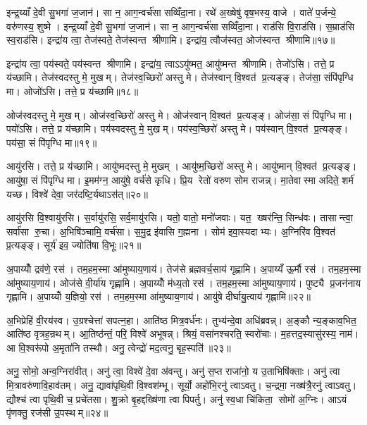 इन्द्र॒य्याँ दे॒वी सु॒भगा॑ ज॒जान॑। सा न॒ आग॒न्वर्च॑सा सव्विँदा॒ना। रथे॑ अ॒ख्षेषु॑ वृष॒भस्य॒ वाजे। वाते॑ प॒र्जन्ये॒ वरु॑णस्य॒ शुष्मे। इन्द्र॒य्याँ दे॒वी सु॒भगा॑ ज॒जान॑। सा न॒ आग॒न्वर्च॑सा सव्विँदा॒ना। राड॑सि वि॒राड॑सि। स॒म्राड॑सि स्व॒राड॑सि। इन्द्रा॑य त्वा॒ तेज॑स्वते॒ तेज॑स्वन्त श्रीणामि। इन्द्रा॑य॒ त्वौज॑स्वत॒ ओज॑स्वन्त श्रीणामि॥१७॥

इन्द्रा॑य त्वा॒ पय॑स्वते॒ पय॑स्वन्त श्रीणामि। इन्द्रा॑य॒ त्वाऽऽयु॑ष्मत॒ आयु॑ष्मन्त श्रीणामि। तेजो॑ऽसि। तत्ते॒ प्र य॑च्छामि। तेज॑स्वदस्तु मे॒ मुखम्। तेज॑स्व॒च्छिरो॑ अस्तु मे। तेज॑स्वान् वि॒श्वत॑ प्र॒त्यङ्ङ्। तेज॑सा॒ संपि॑पृग्धि मा। ओजो॑ऽसि। तत्ते॒ प्र य॑च्छामि॥१८॥

ओज॑स्वदस्तु मे॒ मुखम्। ओज॑स्व॒च्छिरो॑ अस्तु मे। ओज॑स्वान् वि॒श्वत॑ प्र॒त्यङ्ङ्। ओज॑सा॒ सं पि॑पृग्धि मा। पयो॑ऽसि। तत्ते॒ प्र य॑च्छामि। पय॑स्वदस्तु मे॒ मुखम्। पय॑स्व॒च्छिरो॑ अस्तु मे। पय॑स्वान् वि॒श्वत॑ प्र॒त्यङ्ङ्। पय॑सा॒ सं पि॑पृग्धि मा॥१९॥

आयु॑रसि। तत्ते॒ प्र य॑च्छामि। आयु॑ष्मदस्तु मे॒ मुखम्। आयु॑ष्म॒च्छिरो॑ अस्तु मे। आयु॑ष्मान् वि॒श्वत॑ प्र॒त्यङ्ङ्। आयु॑षा॒ सं पि॑पृग्धि मा। इ॒मम॑ग्न॒ आयु॑षे॒ वर्च॑से कृधि। प्रि॒य रेतो॑ वरुण सोम राजन्न्। मा॒तेवास्मा अदिते॒ शर्म॑ यच्छ। विश्वे॑ देवा॒ जर॑दष्टि॒र्यथाऽस॑त्॥२०॥

आयु॑रसि वि॒श्वायु॑रसि। स॒र्वायु॑रसि॒ सर्व॒मायु॑रसि। यतो॒ वातो॒ मनो॑जवाः। यत॒ ख्षर॑न्ति॒ सिन्ध॑वः। तासान्त्वा॒ सर्वा॑सा रु॒चा। अ॒भिषि॑ञ्चामि॒ वर्च॑सा। स॒मु॒द्र इ॑वासि ग॒ह्मना। सोम॑ इवा॒स्यदाभ्यः। अ॒ग्निरि॑व वि॒श्वत॑ प्र॒त्यङ्ङ्। सूर्य॑ इव॒ ज्योति॑षा वि॒भूः॥२१॥

अ॒पाय्योँ द्रव॑णे॒ रस॑। तम॒हम॒स्मा आ॑मुष्याय॒णाय॑। तेज॑से ब्रह्मवर्च॒साय॑ गृह्णामि। अ॒पाय्यँ ऊ॒र्मौ रस॑। तम॒हम॒स्मा आ॑मुष्याय॒णाय॑। ओज॑से वी॒र्या॑य गृह्णामि। अ॒पाय्योँ म॑ध्य॒तो रस॑। तम॒हम॒स्मा आ॑मुष्याय॒णाय॑। पुष्ट्यै प्र॒जन॑नाय गृह्णामि। अ॒पाय्योँ य॒ज्ञियो॒ रस॑। तम॒हम॒स्मा आ॑मुष्याय॒णाय॑। आयु॑षे दीर्घायु॒त्वाय॑ गृह्णामि॥२२॥\anuvakamend[गोष्वोज॑स्वन्त श्रीणा॒म्योजो॑ऽसि॒ तत्ते॒ प्रय॑च्छामि॒ पय॑सा॒ संपि॑पृग्धि॒ माऽस॑द्वि॒भूर्य॒ज्ञियो॒ रसो॒ द्वे च॑]

अ॒भिप्रेहि॑ वी॒रय॑स्व। उ॒ग्रश्चेत्ता॑ सपत्न॒हा। आति॑ष्ठ मित्र॒वर्ध॑नः। तुभ्य॑न्दे॒वा अधि॑ब्रवन्न्। अ॒ङ्कौ न्य॒ङ्काव॒भित॒ आति॑ष्ठ वृत्रह॒न्रथम्। आ॒तिष्ठ॑न्तं॒ परि॒ विश्वे॑ अभूषन्न्। श्रियं॒ वसा॑नश्चरति॒ स्वरो॑चाः। म॒हत्तद॒स्यासु॑रस्य॒ नाम॑। आ वि॒श्वरू॑पो अ॒मृता॑नि तस्थौ। अनु॒ त्वेन्द्रो॑ मद॒त्वनु॒ बृह॒स्पति॑॥२३॥

अनु॒ सोमो॒ अन्व॒ग्निरा॑वीत्। अनु॑ त्वा॒ विश्वे॑ दे॒वा अ॑वन्तु। अनु॑ स॒प्त राजा॑नो॒ य उ॒ताभिषि॑क्ताः। अनु॑ त्वा मि॒त्रावरु॑णावि॒हाव॑तम्। अनु॒ द्यावा॑पृथि॒वी वि॒श्वश॑म्भू। सूर्यो॒ अहो॑भि॒रनु॑ त्वाऽवतु। च॒न्द्रमा॒ नख्ष॑त्रै॒रनु॑ त्वाऽवतु। द्यौश्च॑ त्वा पृथि॒वी च॒ प्रचे॑तसा। शु॒क्रो बृ॒हद्दख्षि॑णा त्वा पिपर्तु। अनु॑ स्व॒धा चि॑किता॒ सोमो॑ अ॒ग्निः। आऽयं पृ॑णक्तु॒ रज॑सी उ॒पस्थम्॥२४॥\anuvakamend[बृह॒स्पति॒ सोमो॑ अ॒ग्निरेक॑ञ्च]

